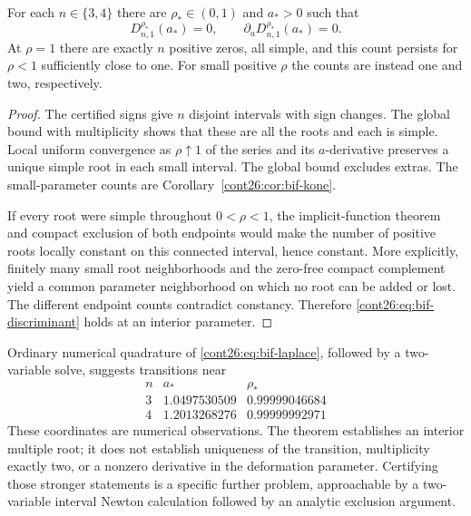 \begin{corollary}
\label{cont26:cor:bif-interior}
For each $n\in\{3,4\}$ there are $\rho_*\in(0,1)$ and $a_*>0$ such that
\begin{equation}\label{cont26:eq:bif-discriminant}
 D_{n,1}^{\rho_*}(a_*)=0,
 \qquad \partial_aD_{n,1}^{\rho_*}(a_*)=0.
\end{equation}
At $\rho=1$ there are exactly $n$ positive zeros, all simple, and this
count persists for $\rho<1$ sufficiently close to one. For small positive
$\rho$ the counts are instead one and two, respectively.
\end{corollary}
\begin{proof}
The certified signs give $n$ disjoint intervals with sign changes.
The global bound with multiplicity shows that these are all the roots
and each is simple. Local uniform convergence as $\rho\uparrow1$ of the
series and its $a$-derivative preserves a unique simple root in each
small interval. The global bound excludes extras. The small-parameter
counts are Corollary~\ref{cont26:cor:bif-kone}.

If every root were simple throughout $0<\rho<1$, the implicit-function
theorem and compact exclusion of both endpoints would make the number
of positive roots locally constant on this connected interval, hence
constant. More explicitly, finitely many small root neighborhoods and
the zero-free compact complement yield a common parameter neighborhood
on which no root can be added or lost. The different endpoint counts
contradict constancy. Therefore \eqref{cont26:eq:bif-discriminant} holds at
an interior parameter.
\end{proof}

Ordinary numerical quadrature of \eqref{cont26:eq:bif-laplace}, followed by a
two-variable solve, suggests transitions near
\[
\begin{array}{c|cc}
n&a_*&\rho_*\\ \hline
3&1.0497530509&0.99999046684\\
4&1.2013268276&0.99999992971
\end{array}
\]
These coordinates are numerical observations. The theorem establishes
an interior multiple root; it does not establish uniqueness of the
transition, multiplicity exactly two, or a nonzero derivative in the
deformation parameter. Certifying those stronger statements is a
specific further problem, approachable by a two-variable interval
Newton calculation followed by an analytic exclusion argument.


